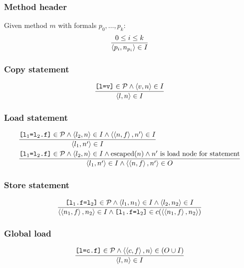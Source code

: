 \documentclass[11pt,notitlepage]{article}
\begin{document}
\subsubsection{Method header}
Given method $m$ with formals $p_0,\ldots,p_k$:
\begin{displaymath}
\dfrac{0\leq i \leq k}{\left\langle p_i, n_{p_i} \right\rangle\in I}
\end{displaymath}

\subsubsection{Copy statement}

\begin{displaymath}
\dfrac
{\text{\tt [l=v]}\in\mathcal{P} \wedge \left\langle v,n \right\rangle\in I}
{\left\langle l,n \right\rangle\in I}
\end{displaymath}

\subsubsection{Load statement}

\begin{eqnarray*}
&
\dfrac
{\text{\tt [l$_1$=l$_2$.f]}\in\mathcal{P} \wedge
 \left\langle l_2,n \right\rangle\in I \wedge
 \left\langle \left\langle n,f \right\rangle,n' \right\rangle\in I}
{\left\langle l_1,n' \right\rangle\in I}
\\&
\dfrac
{\text{\tt [l$_1$=l$_2$.f]}\in\mathcal{P} \wedge
 \left\langle l_2,n \right\rangle\in I \wedge
 \text{escaped}(n) \wedge
 n' \text{ is load node for statement} }
{\left\langle l_1,n' \right\rangle\in I \wedge \left\langle \left\langle n,f \right\rangle,n' \right\rangle\in O}
\end{eqnarray*}

\subsubsection{Store statement}

\begin{displaymath}
\dfrac
{\text{\tt [l$_1$.f=l$_2$]}\in\mathcal{P} \wedge
 \left\langle l_1,n_1 \right\rangle\in I \wedge
 \left\langle l_2,n_2 \right\rangle\in I }
{\left\langle \left\langle n_1,f \right\rangle,n_2 \right\rangle\in I \wedge
 \text{\tt [l$_1$.f=l$_2$]}\in c(\left\langle \left\langle n_1,f \right\rangle,n_2 \right\rangle) }
\end{displaymath}

\subsubsection{Global load}

\begin{displaymath}
\dfrac
{\text{\tt [l=c.f]}\in\mathcal{P} \wedge
 \left\langle \left\langle c,f \right\rangle,n \right\rangle\in (O\cup I) }
{\left\langle l,n \right\rangle\in I}
\end{displaymath}
\end{document}

